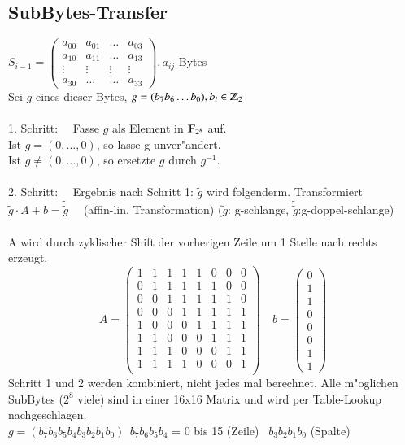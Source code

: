 \subsection{SubBytes-Transfer}
$S_{i-1} =
\begin{pmatrix}
	a_{00} & a_{01} & \ldots & a_{03} \\
	a_{10} & a_{11} & \ldots & a_{13}\\
	\vdots & \vdots  & \vdots & \vdots \\
	a_{30} & \ldots  & \ldots & a_{33}
\end{pmatrix} , a_{ij}$ Bytes\\
Sei $g$ eines dieser Bytes, $g = (b_7b_6\ldots b_0), b_i \in \Z_2$\\
\\
1. Schritt: \ \
Fasse $g$ als Element in $\F_{2^8}$ auf.\\
\indent Ist $g = (0, \ldots, 0)$, so lasse g unver"andert.\\
\indent Ist $g \neq (0, \ldots, 0)$, so ersetzte $g$ durch $g^{-1}$.\\
\\
2. Schritt: \ \ Ergebnis nach Schritt 1: $\tilde{g}$ wird folgenderm. Transformiert\\
\indent $\tilde{g} \cdot A + b = \tilde{\tilde{g}}$ \ \ (affin-lin. Transformation)
($\tilde{g}$: g-schlange, $\tilde{\tilde{g}}$:g-doppel-schlange)\\
\\
A wird durch zyklischer Shift der vorherigen Zeile um 1 Stelle nach rechts erzeugt.
\[
	A = 
	\begin{pmatrix}
		1 & 1 & 1 & 1 & 1 & 0 & 0 & 0\\
		0 & 1 & 1 & 1 & 1 & 1 & 0 & 0\\
		0 & 0 & 1 & 1 & 1 & 1 & 1 & 0\\
		0 & 0 & 0 & 1 & 1 & 1 & 1 & 1\\
		1 & 0 & 0 & 0 & 1 & 1 & 1 & 1\\
		1 & 1 & 0 & 0 & 0 & 1 & 1 & 1\\
		1 & 1 & 1 & 0 & 0 & 0 & 1 & 1\\
		1 & 1 & 1 & 1 & 0 & 0 & 0 & 1\\
	\end{pmatrix}\quad
	b = \begin{pmatrix}
		0 \\ 1 \\ 1 \\ 0 \\ 0 \\ 0 \\ 1 \\ 1
	\end{pmatrix}
\]
Schritt 1 und 2 werden kombiniert, nicht jedes mal berechnet. Alle m"oglichen SubBytes ($2^8$ viele) sind in einer 16x16 Matrix und wird per Table-Lookup nachgeschlagen.\\
$g = (b_7b_6b_5b_4b_3b_2b_1b_0) \ \  b_7b_6b_5b_4$ = 0 bis 15 (Zeile) \ $b_3b_2b_1b_0$ (Spalte)

